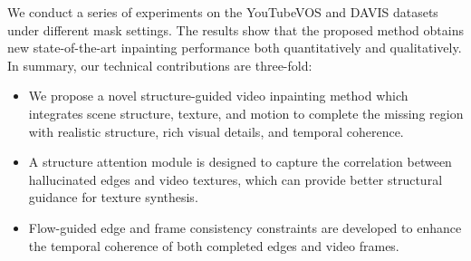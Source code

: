 %
We conduct a series of experiments on the YouTubeVOS and DAVIS datasets under different mask settings. 
The results show that the proposed method obtains new state-of-the-art inpainting performance both quantitatively and qualitatively. 
%
%
In summary, our technical contributions are three-fold:
\begin{itemize}
	\item We propose a novel structure-guided video inpainting method which integrates scene structure, texture, and motion to complete the missing region with realistic structure, rich visual details, and temporal coherence.
	\item A structure attention module is designed to capture the correlation between hallucinated edges and video textures, which can provide better structural guidance for texture synthesis. %
	\item Flow-guided edge and frame consistency constraints are developed to enhance the temporal coherence of both completed edges and video frames.   
\end{itemize}




